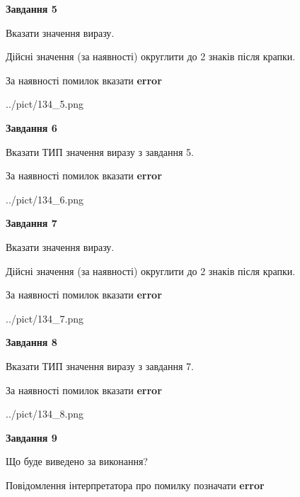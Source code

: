 \documentclass[11pt, ukrainian]{article}
\begin{document}
{\begin {large}
{\begin {center}\textbf{Завдання 5}\end {center}}\par
Вказати значення виразу. \par
Дійсні значення (за наявності) округлити до 2 знаків після крапки. \par
За наявності помилок вказати \textbf{error}

\begin{center}
	{../pict/134_5.png}
\end{center}
\newpage

{\begin {center}\textbf{Завдання 6}\end {center}}\par
Вказати ТИП значення виразу з завдання 5. \par
За наявності помилок вказати \textbf{error}

\begin{center}
	{../pict/134_6.png}
\end{center}
\newpage

{\begin {center}\textbf{Завдання 7}\end {center}}\par
Вказати значення виразу. \par
Дійсні значення (за наявності) округлити до 2 знаків після крапки. \par
За наявності помилок вказати \textbf{error}

\begin{center}
	{../pict/134_7.png}
\end{center}
\newpage

{\begin {center}\textbf{Завдання 8}\end {center}}\par
Вказати ТИП значення виразу з завдання 7. \par
За наявності помилок вказати \textbf{error}

\begin{center}
	{../pict/134_8.png}
\end{center}
\newpage

{\begin {center}\textbf{Завдання 9}\end {center}}\par
Що буде виведено за виконання? \par
Повідомлення інтерпретатора про помилку позначати \textbf{error}


\end{large}}
\end{document}

